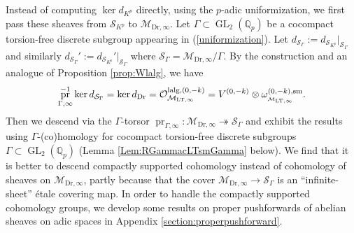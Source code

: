 \documentclass{article}
\theoremstyle{definition}
\def\calM{\mathcal{M}}
\def\calO{\mathcal{O}}
\def\calS{\mathcal{S}}
\def\bbQ{\mathbb{Q}}
\def\surj{\twoheadrightarrow}
\DeclareMathOperator{\pr}{pr}
\DeclareMathOperator{\GL}{GL}
\def\LT{\mathrm{LT}}
\def\sm{\mathrm{sm}}
\def\lalg{\mathrm{lalg}}
\def\Dr{\mathrm{Dr}}
\begin{document}
Instead of computing $\ker d_{K^p}$ directly, using the $p$-adic uniformization, we first pass these sheaves from $\calS_{K^p}$ to $\calM_{\Dr,\infty}$. Let $\Gamma\subset \GL_2(\bbQ_p)$ be a cocompact torsion-free discrete subgroup appearing in (\ref{uniformization}). Let $d_{\calS_{\Gamma}}:=d_{\calS_{K^p}}|_{\calS_{\Gamma}}$ and similarly $d_{\calS_{\Gamma}}':=d_{\calS_{K^p}}'|_{\calS_{\Gamma}}$ where $\calS_{\Gamma}=\calM_{\Dr,\infty}/\Gamma$. By the construction and an analogue of Proposition \ref{prop:Wlalg}, we have 
\begin{equation}\label{equationkerdDr}
    \pr_{\Gamma,\infty}^{-1}\ker d_{\calS_{\Gamma}}=\ker d_{\Dr}=\calO_{\calM_{\LT,\infty}}^{\lalg,(0,-k)}=V^{(0,-k)}\otimes\omega_{\cal_{\calM_{\LT,\infty}}}^{(0,-k),\sm}.
\end{equation}
Then we descend via the $\Gamma$-torsor $\pr_{\Gamma,\infty}:\calM_{\Dr,\infty}\surj \calS_{\Gamma}$ and exhibit the results using $\Gamma$-(co)homology for cocompact torsion-free discrete subgroups $\Gamma\subset \GL_2(\bbQ_p)$ (Lemma \ref{Lem:RGammacLTsmGamma} below). We find that it is better to descend compactly supported cohomology instead of cohomology of sheaves on $\calM_{\Dr,\infty}$, partly because that the cover $\calM_{\Dr,\infty}\to  \calS_{\Gamma}$ is an ``infinite-sheet'' \'etale covering map. In order to handle the compactly supported cohomology groups, we develop some results on proper pushforwards of abelian sheaves on adic spaces in Appendix \ref{section:properpushforward}.
\end{document}
